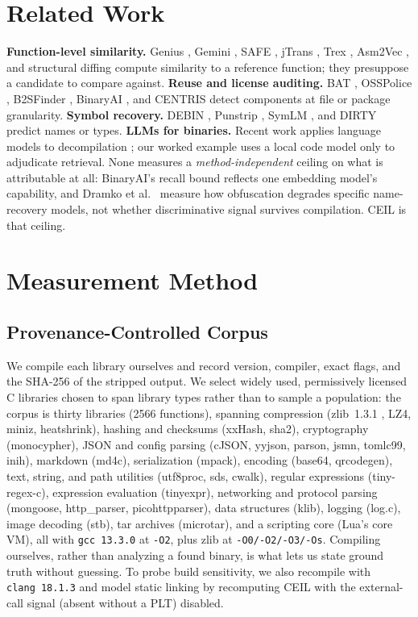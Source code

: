 \documentclass[conference]{IEEEtran}
\begin{document}
\section{Related Work}
\textbf{Function-level similarity.} Genius \cite{genius}, Gemini \cite{gemini},
SAFE \cite{safe}, jTrans \cite{jtrans}, Trex \cite{trex}, Asm2Vec \cite{asm2vec},
and structural diffing \cite{bindiff} compute similarity to a reference function;
they presuppose a candidate to compare against. \textbf{Reuse and license
auditing.} BAT \cite{bat}, OSSPolice \cite{osspolice}, B2SFinder \cite{b2sfinder},
BinaryAI \cite{binaryai}, and CENTRIS \cite{centris} detect components at file or package granularity.
\textbf{Symbol recovery.} DEBIN \cite{debin}, Punstrip \cite{punstrip}, SymLM
\cite{symlm}, and DIRTY \cite{dirty} predict names or types. \textbf{LLMs for
binaries.} Recent work applies language models to decompilation
\cite{llm4decompile}; our worked example uses a local code model
\cite{qwen25coder,ollama} only to adjudicate retrieval. None measures a
\emph{method-independent} ceiling on what is attributable at all: BinaryAI's recall
bound reflects one embedding model's capability, and Dramko et al.\ \cite{dramko_dimva}
measure how obfuscation degrades specific name-recovery models, not whether
discriminative signal survives compilation. CEIL is that ceiling.

\section{Measurement Method}
\subsection{Provenance-Controlled Corpus}
We compile each library ourselves and record version, compiler, exact flags, and
the SHA-256 of the stripped output. We select widely used, permissively licensed C
libraries chosen to span library types rather than to sample a population: the corpus
is thirty libraries (2566 functions), spanning
compression (zlib~1.3.1 \cite{zlib}, LZ4, miniz, heatshrink), hashing and checksums
(xxHash, sha2), cryptography (monocypher), JSON and config parsing (cJSON, yyjson,
parson, jsmn, tomlc99, inih), markdown (md4c), serialization (mpack), encoding (base64,
qrcodegen), text, string, and path utilities (utf8proc, sds, cwalk), regular expressions
(tiny-regex-c), expression evaluation (tinyexpr), networking and protocol parsing
(mongoose, http\_parser, picohttpparser), data structures (klib), logging (log.c), image
decoding (stb), tar archives (microtar), and a scripting core
(Lua's core VM), all with \texttt{gcc~13.3.0} at \texttt{-O2}, plus zlib at
\texttt{-O0/-O2/-O3/-Os}. Compiling ourselves, rather than analyzing a found binary,
is what lets us state ground truth without guessing. To probe build sensitivity, we
also recompile with \texttt{clang~18.1.3} and model static linking by recomputing CEIL
with the external-call signal (absent without a PLT) disabled.
\end{document}
